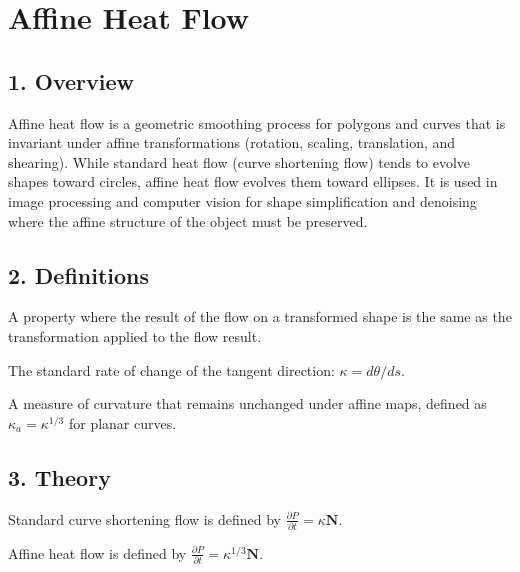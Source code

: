 \section{Affine Heat Flow}
\label{sec:affine_heat_flow}

\subsection{1. Overview}

Affine heat flow is a geometric smoothing process for polygons and curves that is invariant under affine transformations (rotation, scaling, translation, and shearing). While standard heat flow (curve shortening flow) tends to evolve shapes toward circles, affine heat flow evolves them toward ellipses. It is used in image processing and computer vision for shape simplification and denoising where the affine structure of the object must be preserved.

\subsection{2. Definitions}

\begin{definition}\label{def:affine_invariance}
A property where the result of the flow on a transformed shape is the same as the transformation applied to the flow result.
\end{definition}

\begin{definition}\label{def:euclidean_curvature}
The standard rate of change of the tangent direction: $\kappa = d\theta/ds$.
\end{definition}

\begin{definition}\label{def:affine_curvature}
A measure of curvature that remains unchanged under affine maps, defined as $\kappa_a = \kappa^{1/3}$ for planar curves.
\end{definition}

\subsection{3. Theory}

Standard curve shortening flow is defined by $\frac{\partial P}{\partial t} = \kappa \mathbf{N}$.

Affine heat flow is defined by $\frac{\partial P}{\partial t} = \kappa^{1/3} \mathbf{N}$.


